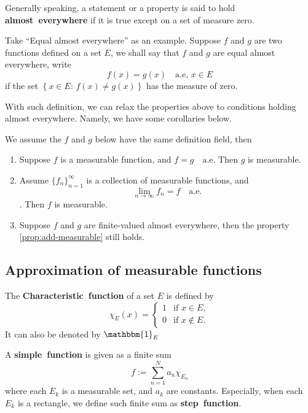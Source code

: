 \documentclass{ctexbook}
\begin{document}
\begin{define}
    Generally speaking, a statement or a property is said to hold \textbf{almost~everywhere} if it is true except on a set of measure
    zero. 
\end{define}
Take ``Equal almost everywhere'' as an example. Suppose $f$ and $g$ are two functions defined on a set $E$, we shall say that $f$ and
$g$ are equal almost everywhere, write
\[f(x) = g(x) \quad \text{a.e},\, x\in E\]
if the set $\left\{x\in E:\, f(x)\neq g(x) \right\} $ has the measure of zero.

With such definition, we can relax the properties above to conditions holding almost everywhere. Namely, we have some corollaries
below.
\begin{cor}
    We assume the $f$ and $g$ below have the same definition field, then
    \begin{enumerate}
        \item Suppose $f$ is a measurable function, and $f=g\quad \text{a.e.}$ Then $g$ is measurable.
        \item Assume $\{f_n\}_{n=1}^\infty$ is a collection of measurable functions, and \[\lim\limits_{n\rightarrow\infty}f_n = f\quad \text{a.e.}\]. Then $f$ is measurable.
        \item Suppose $f$ and $g$ are finite-valued almost everywhere, then the property \ref{prop:add-measurable} still holds.
    \end{enumerate}
\end{cor} 

\subsection*{Approximation of measurable functions}

\begin{define}
    The \textbf{Characteristic~function} of a set $E$ is defined by
    \[\chi_E(x) = \begin{cases}
        1 & \text{if } x \in E,\\
        0 & \text{if } x \notin E.
    \end{cases}\]
    It can also be denoted by $\mathbbm{1}_E$
\end{define}

\begin{define}
    A \textbf{simple~function} is given as a finite sum
    \begin{equation*}
        f := \sum\limits_{n = 1}^N a_n\chi_{E_n}
    \end{equation*}
    where each $E_k$ is a measurable set, and $a_k$ are constants.
    Especially, when each $E_k$ is a rectangle, we define such finite sum as \textbf{step~function}.
\end{define}
\end{document}
